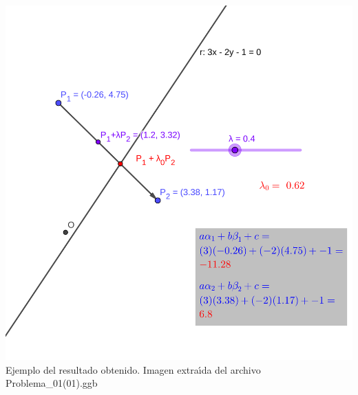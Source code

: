 \begin{solucion}
 \begin{center}
  \includegraphics{Problema_01.png}
  \\
  Ejemplo del resultado obtenido.
  Imagen extra\'{\i}da del archivo Problema\_01(01).ggb
 \end{center}
 
\end{solucion}

